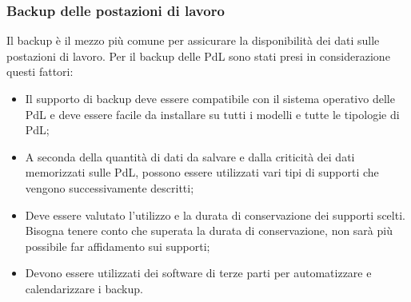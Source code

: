 \documentclass[12pt, a4paper, titlepage]{report}
\begin{document}
	\subsubsection{Backup delle postazioni di lavoro}
	
	Il backup è il mezzo più comune per assicurare la disponibilità dei dati sulle postazioni di lavoro. Per il backup delle PdL sono stati presi in considerazione questi fattori:
	\begin{itemize}
		\item Il supporto di backup deve essere compatibile con il sistema operativo delle PdL e deve essere facile da installare su tutti i modelli e tutte le tipologie di PdL;
		\item A seconda della quantità di dati da salvare e dalla criticità dei dati memorizzati sulle PdL, possono essere utilizzati vari tipi di supporti che vengono successivamente descritti;
		\item Deve essere valutato l'utilizzo e la durata di conservazione dei supporti scelti. Bisogna tenere conto che superata la durata di conservazione, non sarà più possibile far affidamento sui supporti;
		\item Devono essere utilizzati dei software di terze parti per automatizzare e calendarizzare i backup.
	\end{itemize}
	
\end{document}
